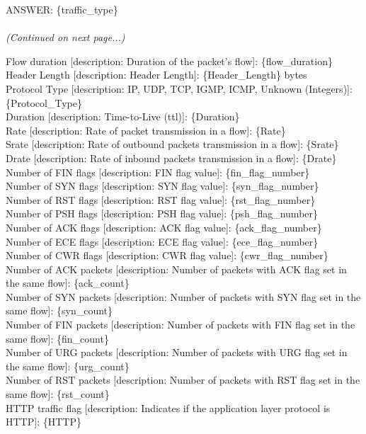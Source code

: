 \documentclass[11pt]{article}
\theoremstyle{plain}
\theoremstyle{definition}
\begin{document}
{\begin{tcolorbox}[userbox]
ANSWER:
\{traffic\_type\}\\\\
\textit{(Continued on next page...)}
\end{tcolorbox}
\begin{tcolorbox}[userbox]
Flow duration [description: Duration of the packet’s flow]: \{flow\_duration\} \\
Header Length [description: Header Length]: \{Header\_Length\} bytes \\
Protocol Type [description: IP, UDP, TCP, IGMP, ICMP, Unknown (Integers)]: \{Protocol\_Type\} \\
Duration [description: Time-to-Live (ttl)]: \{Duration\} \\
Rate [description: Rate of packet transmission in a flow]: \{Rate\} \\
Srate [description: Rate of outbound packets transmission in a flow]: \{Srate\} \\
Drate [description: Rate of inbound packets transmission in a flow]: \{Drate\} \\
Number of FIN flags [description: FIN flag value]: \{fin\_flag\_number\} \\
Number of SYN flags [description: SYN flag value]: \{syn\_flag\_number\} \\
Number of RST flags [description: RST flag value]: \{rst\_flag\_number\} \\
Number of PSH flags [description: PSH flag value]: \{psh\_flag\_number\} \\
Number of ACK flags [description: ACK flag value]: \{ack\_flag\_number\} \\
Number of ECE flags [description: ECE flag value]: \{ece\_flag\_number\} \\
Number of CWR flags [description: CWR flag value]: \{cwr\_flag\_number\} \\
Number of ACK packets [description: Number of packets with ACK flag set in the same flow]: \{ack\_count\} \\
Number of SYN packets [description: Number of packets with SYN flag set in the same flow]: \{syn\_count\} \\
Number of FIN packets [description: Number of packets with FIN flag set in the same flow]: \{fin\_count\} \\
Number of URG packets [description: Number of packets with URG flag set in the same flow]: \{urg\_count\} \\
Number of RST packets [description: Number of packets with RST flag set in the same flow]: \{rst\_count\} \\
HTTP traffic flag [description: Indicates if the application layer protocol is HTTP]: \{HTTP\} \\


\end{tcolorbox}}
\end{document}
